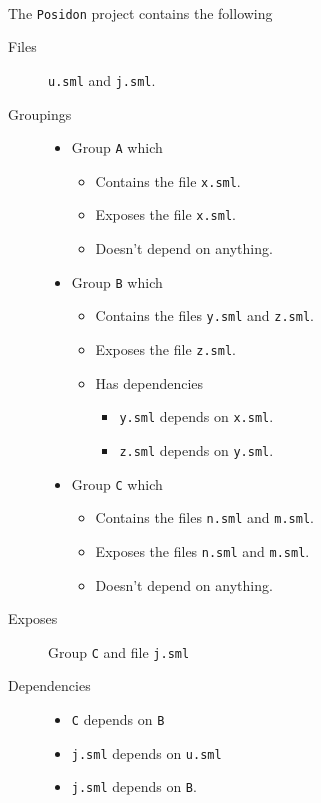 \begin{example}\ 
  \label{ex:Sample-project-file-posidon}
  
  The \texttt{Posidon} project contains the following 

  \begin{description}
  \item[Files] 
    \texttt{u.sml} and \texttt{j.sml}.
    
  \item[Groupings] 
    \begin{itemize}
    \item Group \texttt{A} which
      \begin{itemize}
      \item Contains the file \texttt{x.sml}.
      \item Exposes the file \texttt{x.sml}.
      \item Doesn't depend on anything.
      \end{itemize}
      
    \item Group \texttt{B} which
      \begin{itemize}
      \item Contains the files \texttt{y.sml} and \texttt{z.sml}.
      \item Exposes the file \texttt{z.sml}.
      \item Has dependencies
        \begin{itemize}
        \item \texttt{y.sml} depends on \texttt{x.sml}.
        \item \texttt{z.sml} depends on \texttt{y.sml}.
        \end{itemize}
      \end{itemize}
      
    \item Group \texttt{C} which
      \begin{itemize}
      \item Contains the files \texttt{n.sml} and \texttt{m.sml}.
      \item Exposes the files \texttt{n.sml} and \texttt{m.sml}.
      \item Doesn't depend on anything.
      \end{itemize}
    \end{itemize}


  \item[Exposes] 
    Group \texttt{C} and file \texttt{j.sml}
    
  \item[Dependencies] 
    \begin{itemize}
    \item \texttt{C} depends on \texttt{B}
    \item \texttt{j.sml} depends on \texttt{u.sml}
    \item \texttt{j.sml} depends on \texttt{B}.
    \end{itemize} 
  \end{description}

\end{example}


